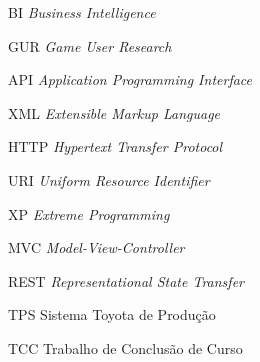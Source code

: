 \begin{siglas}
  \item[BI] \textit{Business Intelligence}
  \item[GUR] \textit{Game User Research}
  \item[API] \textit{Application Programming Interface}
  \item[XML] \textit{Extensible Markup Language}
  \item[HTTP] \textit{Hypertext Transfer Protocol}
  \item[URI] \textit{Uniform Resource Identifier}
  \item[XP] \textit{Extreme Programming}
  \item[MVC] \textit{Model-View-Controller}
  \item[REST] \textit{Representational State Transfer}
  \item[TPS] Sistema Toyota de Produção
  \item[TCC] Trabalho de Conclusão de Curso
\end{siglas}
